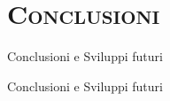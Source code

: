 \documentclass[xcolor=x11names,compress]{beamer}
\begin{document}
\section{\scshape Conclusioni}
{
\begin{frame}[t]{Conclusioni e Sviluppi futuri}
    
\end{frame}}

{
\begin{frame}[t]{Conclusioni e Sviluppi futuri}
    
    
\end{frame}}
\end{document}
